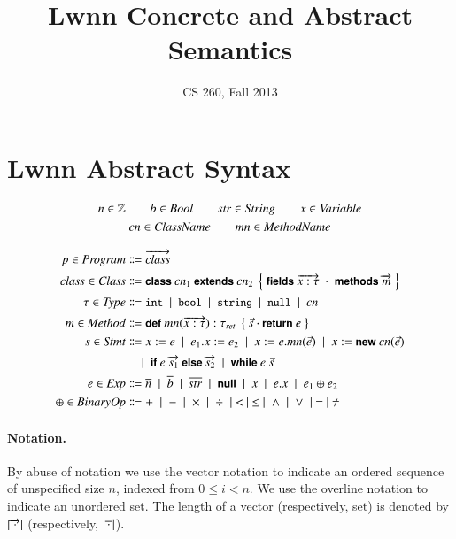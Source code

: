 \documentclass[10pt]{article}
\begin{document}
\title{\textbf{\textsf{Lwnn}} Concrete and Abstract Semantics}
\author{CS 260, Fall 2013}
\date{}

\maketitle

\section{Lwnn Abstract Syntax}

\begin{gather*}
  n \in \mathbb{Z} \qquad b \in \mathit{Bool} \qquad \mathit{str} \in \mathit{String} \qquad
  x \in \mathit{Variable} 
  \\ 
  \mathit{cn} \in \mathit{ClassName} \qquad \mathit{mn} \in \mathit{MethodName}
\end{gather*}

\nvsp\nvsp

\begin{align*}
  p \in \Program &\Coloneqq \wseq{\class}
  \\%
  \class \in \Class &\Coloneqq \kw{class } \cname_1 \kw{ extends }
  \cname_2 \;\left\{\; \kw{fields }\wseq{x : \typ} \;\cdot\; \kw{methods
  }\wseq{m} \;\right\} 
  \\%
  \typ \in \Type &\Coloneqq \intt \alt \boolt \alt \strt \alt \nullt
  \alt \cname
  \\%
  m \in \Method &\Coloneqq \kw{def }\mname(\wseq{x : \typ}) :
  \typ_{\mtt{ret}} \; \left\{\; \seq{\stmt} \cdot \kw{return }e \;\right\}
  \\%
  \stmt \in \Stmt &\Coloneqq x := e \alt e_1.x := e_2 \alt x :=
  e.\mname(\seq{e}) \alt x := \kw{new }\cname(\seq{e})
  \\
  &\lalt \cond{e}{\wseq{\stmt_1}}{\wseq{\stmt_2}} \alt
  \while{e}{\seq{\stmt}}
  \\%
  e \in \Exp &\Coloneqq \uset{n} \alt \uset{b} \alt \uset{\str} \alt \nullv
  \alt x \alt e.x \alt e_1 \binop e_2 
  \\%
  \binop \in \BinOp &\Coloneqq + \alt - \alt \times \alt \div \alt < \alt
  \leq \alt \land \alt \lor \alt = \alt \neq
\end{align*}

\paragraph{Notation.} By abuse of notation we use the vector notation
\wseq{\something} to indicate an ordered sequence of unspecified size
$n$, indexed from $0 \leq i < n$. We use the overline notation
\uset{\something} to indicate an unordered set. The length of a vector
(respectively, set) is denoted by $|\overrightarrow{\,\cdot\,}|$ (respectively,
$|\overline{\,\cdot\,}|$).
\end{document}
